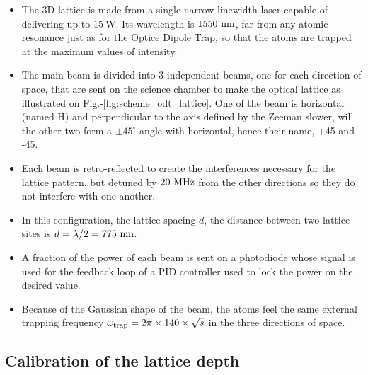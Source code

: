 \begin{itemize}
    \item The 3D lattice is made from a single narrow linewidth laser capable of delivering up to $15 \ \mathrm{W}$. Its wavelength is $1550 \ \rm{nm}$, \ie far from any atomic resonance just as for the Optice Dipole Trap, so that the atoms are trapped at the maximum values of intensity.
    \item  The main beam is divided into 3 independent beams, one for each direction of space, that are sent on the science chamber to make the optical lattice as illustrated on Fig.-\ref{fig:scheme_odt_lattice}. One of the beam is horizontal (named H) and perpendicular to the axis defined by the Zeeman slower, will the other two form a $\pm 45^{\circ}$ angle with horizontal, hence their name, +45 and -45.
    \item  Each beam is retro-reflected to create the interferences necessary for the lattice pattern, but detuned by $20 \ \rm{MHz}$ from the other directions so they do not interfere with one another.
    \item In this configuration, the lattice spacing $d$, \ie the distance between two lattice sites is $d=\lambda/2 = 775 \ \rm{nm}$.
    
    
    
    
    \item A fraction of the power of each beam is sent on a photodiode whose signal is used for the feedback loop of a PID controller used to lock the power on the desired value.
    
    \item Because of the Gaussian shape of the beam, the atoms feel the same external trapping frequency $\omega_{\rm{trap}} = 2 \pi \times 140 \times \sqrt{s}$ in the three directions of space.  
    
\end{itemize}



 
\subsection{Calibration of the lattice depth}

